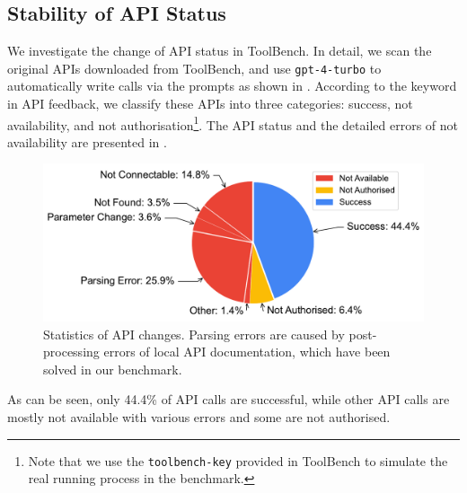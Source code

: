     





\subsection{Stability of API Status}
\label{api_status}
We investigate the change of API status in ToolBench. 
In detail, we scan the original APIs downloaded from ToolBench, and use \texttt{gpt-4-turbo} to automatically write calls via the prompts as shown in .
According to the keyword in API feedback, we classify these APIs into three categories: success, not availability, and not authorisation\footnote{Note that we use the \texttt{toolbench-key} provided in ToolBench to simulate the real running process in the benchmark.}.
The API status and the detailed errors of not availability are presented in . 
\begin{figure}[]
    \centering   
    \includegraphics[width=\linewidth]{figs/api_status_merged.pdf}
    \caption{Statistics of API changes. Parsing errors are caused by post-processing errors of local API documentation, which have been solved in our benchmark.}
   
    \label{fig:api_change_info}
\end{figure}
As can be seen, only 44.4\% of API calls are successful, while other API calls are mostly not available with various errors and some are not authorised.

